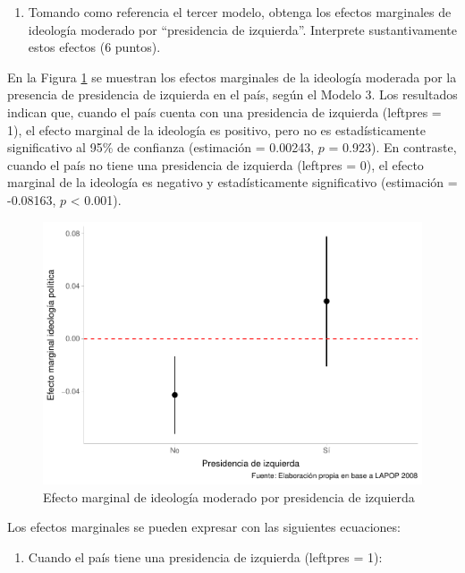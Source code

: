 \documentclass[
  12pt,
  a4paper,
]{article}
\providecommand{\tightlist}{%
  \setlength{\itemsep}{0pt}\setlength{\parskip}{0pt}}
\begin{document}
\begin{enumerate}
\def\labelenumi{\alph{enumi})}
\setcounter{enumi}{5}
\tightlist
\item
  Tomando como referencia el tercer modelo, obtenga los efectos marginales de ideología moderado por ``presidencia de izquierda''. Interprete sustantivamente estos efectos (6 puntos).
\end{enumerate}

En la Figura \ref{fig:fig3} se muestran los efectos marginales de la ideología moderada por la presencia de presidencia de izquierda en el país, según el Modelo 3. Los resultados indican que, cuando el país cuenta con una presidencia de izquierda (leftpres = 1), el efecto marginal de la ideología es positivo, pero no es estadísticamente significativo al 95\% de confianza (estimación = 0.00243, \(p\) = 0.923). En contraste, cuando el país no tiene una presidencia de izquierda (leftpres = 0), el efecto marginal de la ideología es negativo y estadísticamente significativo (estimación = -0.08163, \(p\) \textless{} 0.001).

\begin{figure}

{\centering \includegraphics[width=0.8\linewidth]{01-guia_files/figure-latex/fig3-1} 

}

\caption{Efecto marginal de ideología moderado por presidencia de izquierda}\label{fig:fig3}
\end{figure}

Los efectos marginales se pueden expresar con las siguientes ecuaciones:

\begin{enumerate}
\def\labelenumi{\arabic{enumi}.}
\tightlist
\item
  Cuando el país tiene una presidencia de izquierda (leftpres = 1):
\end{enumerate}
\end{document}
